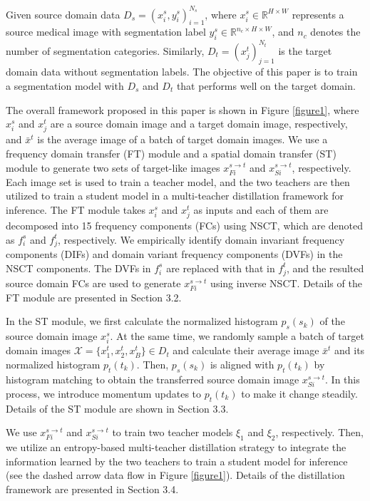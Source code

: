 \documentclass[letterpaper]{article} %
\begin{document}
Given source domain data $D_s={(x_i^s,y_i^s)}_{i=1}^{N_s}$, where $x_i^s\in{\mathbb{R} ^{H\times{W}}}$ represents a source medical image with segmentation label 
 $y_i^s\in{\mathbb{R}^{{n_c}\times{H}\times{W}}}$, and $n_c$ denotes the number of segmentation categories. Similarly, $D_t={(x_j^t)}_{j=1}^{N_t}$ is the target domain data 
without segmentation labels. The objective of this paper is to train a segmentation model with $D_s$ and $D_t$ that performs well on the target domain.

The overall framework proposed in this paper is shown in Figure \ref{figure1}, where $x_i^s$ and $x_j^t$ are a source domain image and a target domain image, 
respectively, and $\bar{x}^t$ is the average image of a batch of target domain images. We use a frequency domain transfer (FT) module and a spatial 
domain transfer (ST) module to generate two sets of target-like images $x_{Fi}^{s\to{t}}$ and $x_{Si}^{s\to{t}}$, respectively. Each image set is used 
to train a teacher model, and the two teachers are then utilized to train a student model in a 
multi-teacher distillation framework for inference. The FT module takes $x_i^s$ and $x_j^t$ as inputs and each of them are decomposed into 15 frequency components 
(FCs) using NSCT, which are denoted as $f_i^s$ and $f_j^t$, respectively. We empirically identify domain invariant frequency components (DIFs) and 
domain variant frequency components (DVFs) in the NSCT components. The DVFs in $f_i^s$ are replaced with that in $f_j^t$, and the resulted source domain FCs are used 
to generate $x_{Fi}^{s\to{t}}$ using inverse NSCT. Details of the FT module are presented in Section 3.2.

In the ST module, we first calculate the normalized histogram $p_s(s_k)$ of the source domain image $x_i^s$. At the same time, we 
randomly sample a batch of target domain images $\mathcal{X}  =\{x_1^t,x_2^t,x_B^t\}\in{D_t}$ and calculate their average image $\bar{x}^t$ and its normalized histogram $p_t(t_k)$. 
Then, $p_s(s_k)$ is aligned with $p_t(t_k)$ by histogram matching to obtain the transferred source domain image $x_{Si}^{s\to{t}}$. In this process, 
we introduce momentum updates to $p_t(t_k)$ to make it change steadily. Details of the ST module are shown in Section 3.3. 

We use $x_{Fi}^{s\to{t}}$ and $x_{Si}^{s\to{t}}$ to train two teacher models 
$\xi_1$ and $\xi_2$, respectively. Then, we utilize  an entropy-based multi-teacher distillation strategy \cite{34} to integrate the information 
learned by the two teachers to train a student model for inference (see the dashed arrow data flow in Figure \ref{figure1}). Details of the distillation framework are 
presented in Section 3.4.
\end{document}
